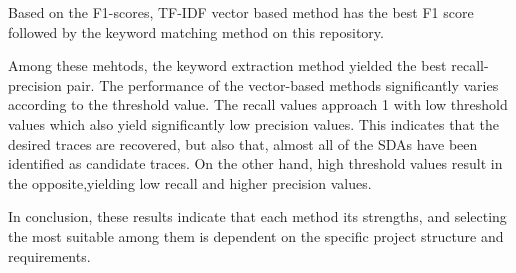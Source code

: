 Based on the F1-scores, TF-IDF vector based method has the best F1 score followed by the keyword matching method on this repository.

Among these mehtods,  the keyword extraction method yielded the best recall-precision pair.
The performance of the vector-based methods  significantly varies according to the threshold value.
The recall values  approach 1 with low  threshold values which also yield significantly low precision values.
 This indicates that the desired traces are recovered, but also that,  almost all of the SDAs have been identified as candidate traces.
 On the other hand, high threshold values result in the  opposite,yielding low recall and higher precision values.

In conclusion, these results indicate that each method its strengths, and selecting the most suitable among them is dependent  on the specific project structure and requirements. 

